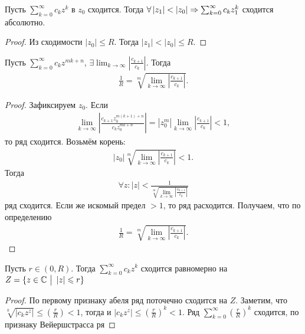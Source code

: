 \documentclass[../main.tex]{subfiles}
\begin{document}
\begin{proposition}
    Пусть $ \sum_{k=0}^{\infty} c_k z^k $ в $ z_0$  сходится. Тогда $ \forall \left| z_1 \right| < \left| z_0 \right| \Rightarrow \sum_{k=0}^{\infty} c_k z_1 ^k $ сходится абсолютно.  
\end{proposition}

\begin{proof}
    Из сходимости $ \left| z_0  \right| \leq R$. Тогда $ \left| z_1 \right|  < \left| z_0  \right| \leq R$.  
\end{proof}


\begin{proposition}
  Пусть $ \sum_{k=0}^{\infty} c_k z^{mk+n} $, $ \exists \lim_{k \to \infty} \left| \frac{c_{k+1}}{c_k } \right| $. Тогда 
  \begin{gather} 
    \frac{1}{R} = \sqrt[m]{\lim_{k \to \infty} \left| \frac{c_{k+1}}{c_k } \right| } .
  \end{gather} 
\end{proposition}


\begin{proof}
  Зафиксируем $ z_0 $. Если 
  \begin{gather} 
    \lim_{k \to \infty} \left| \frac{c_{k+1} z_0 ^{m(k+1) + n}}{c_k z_0 ^{mk +n}} \right| = \left| z_0 ^{ m} \right| \lim_{k \to \infty} \left| \frac{c_{k+1}}{c_k } \right|  < 1,
  \end{gather} 
  то ряд сходится. Возьмём корень: 
  \begin{gather} 
    \left| z_0  \right| \sqrt[m]{\lim_{k \to \infty} \left| \frac{c_{k+1}}{c_k } \right| } < 1 .
  \end{gather}
  Тогда 
  \begin{gather} 
    \forall z: \left| z \right| < \frac{1}{\sqrt[m]{\lim_{k \to \infty} \left| \frac{c_{k+1}}{c_k } \right| }} 
  \end{gather}
  ряд сходится. Если же искомый предел $ >1$, то ряд расходится. Получаем, что по определению 
  \begin{gather} 
    \frac{1}{R} = \sqrt[m]{\lim_{k \to \infty} \left| \frac{c_{k+1}}{c_k } \right| }.
  \end{gather}  
\end{proof}


\begin{proposition}
  Пусть $ r \in (0, R).$ Тогда $ \sum_{k=0}^{\infty} c_k z^k $ сходится равномерно на $ Z = \{ z \in \mathbb{C} \ \big|\  \left| z \right| \leqslant r \} $  
\end{proposition}


\begin{proof}
  По первому признаку абеля ряд поточечно сходится на $ Z$. Заметим, что 
$ \sqrt[k]{|c_k z^z|} \leq \left( \frac{r}{R}\right) < 1$, тогда и $ {|c_k z^z|} \leq \left( \frac{r}{R}\right)^{k} < 1$. Ряд $ \sum_{k=0}^{\infty} \left(\frac{r}{R}\right)^{k} $ сходится, по признаку Вейершстрасса ря
\end{proof}
\end{document}

